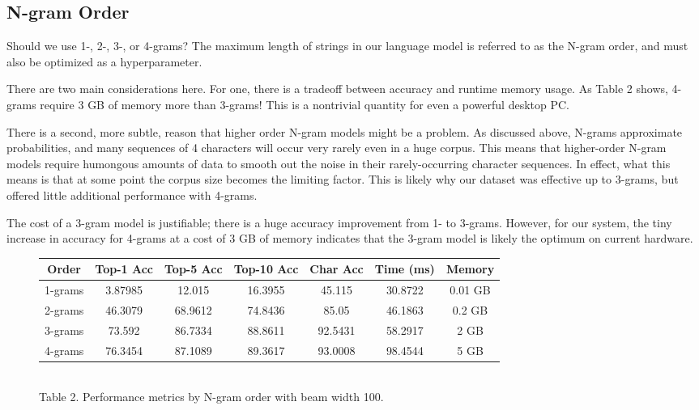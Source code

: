 \documentclass[11pt]{ctexart}
\begin{document}
\subsection{N-gram Order}

Should we use 1-, 2-, 3-, or 4-grams? The maximum length of strings
in our language model is referred to as the N-gram order,
and must also be optimized as a hyperparameter.

There are two main considerations here.
For one, there is a tradeoff between accuracy and runtime memory usage.
As Table 2 shows, 4-grams require 3 GB of memory more than 3-grams!
This is a nontrivial quantity for even a powerful desktop PC.

There is a second, more subtle, reason that higher order
N-gram models might be a problem. As discussed above,
N-grams approximate probabilities, and many sequences of 4 characters
will occur very rarely even in a huge corpus.
This means that higher-order N-gram models require humongous amounts
of data to smooth out the noise in their rarely-occurring
character sequences. In effect, what this means is that at some point
the corpus size becomes the limiting factor. This is likely why
our dataset was effective up to 3-grams, but offered little additional
performance with 4-grams.

The cost of a 3-gram model is justifiable; there is a huge accuracy improvement from 1- to 3-grams. However, for our system, the tiny increase in accuracy for 4-grams at a cost of 3 GB of memory indicates that the 3-gram model is likely the optimum on current hardware.

\begin{figure}[htp]
\centering

\begin{tabular}{ c|c|c|c|c|c|c } 
Order & Top-1 Acc & Top-5 Acc & Top-10 Acc & Char Acc & Time (ms) & Memory\\ 
 \hline
1-grams & 3.87985 & 12.015 & 16.3955 & 45.115 & 30.8722 & 0.01 GB \\
2-grams & 46.3079 & 68.9612 & 74.8436 & 85.05 & 46.1863 & 0.2 GB \\
3-grams & 73.592 & 86.7334 & 88.8611 & 92.5431 & 58.2917 & 2 GB \\
4-grams & 76.3454 & 87.1089 & 89.3617 & 93.0008 & 98.4544 & 5 GB \\
\end{tabular}
\\
\vspace{5mm}
Table 2. Performance metrics by N-gram order with beam width 100.

\end{figure}
\end{document}
